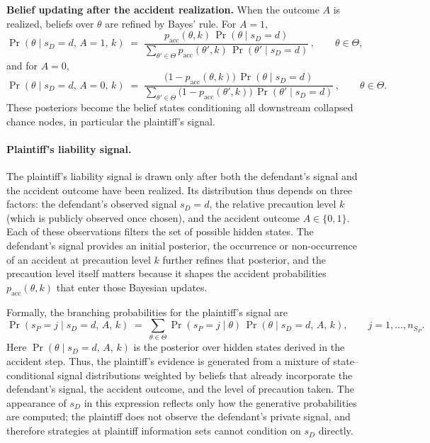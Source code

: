 \documentclass{article}
\begin{document}
\medskip
\noindent\textbf{Belief updating after the accident realization.}
When the outcome $A$ is realized, beliefs over $\theta$ are refined by Bayes’ rule. For $A=1$,
\[
\Pr(\theta \mid s_D=d,\,A=1,\,k)
\;=\;
\frac{p_{\mathrm{acc}}(\theta,k)\,\Pr(\theta \mid s_D=d)}
{\sum_{\theta'\in\Theta} p_{\mathrm{acc}}(\theta',k)\,\Pr(\theta' \mid s_D=d)}\,,
\qquad \theta\in\Theta,
\]
and for $A=0$,
\[
\Pr(\theta \mid s_D=d,\,A=0,\,k)
\;=\;
\frac{\bigl(1-p_{\mathrm{acc}}(\theta,k)\bigr)\,\Pr(\theta \mid s_D=d)}
{\sum_{\theta'\in\Theta} \bigl(1-p_{\mathrm{acc}}(\theta',k)\bigr)\,\Pr(\theta' \mid s_D=d)}\,,
\qquad \theta\in\Theta.
\]
These posteriors become the belief states conditioning all downstream collapsed chance nodes, in particular the plaintiff’s signal.

\paragraph{Plaintiff’s liability signal.}
The plaintiff’s liability signal is drawn only after both the defendant’s signal and the accident outcome have been realized. Its distribution thus depends on three factors: the defendant’s observed signal $s_D=d$, the relative precaution level $k$ (which is publicly observed once chosen), and the accident outcome $A\in\{0,1\}$. Each of these observations filters the set of possible hidden states. The defendant’s signal provides an initial posterior, the occurrence or non-occurrence of an accident at precaution level $k$ further refines that posterior, and the precaution level itself matters because it shapes the accident probabilities $p_{\mathrm{acc}}(\theta,k)$ that enter those Bayesian updates.

Formally, the branching probabilities for the plaintiff’s signal are
\[
\Pr(s_P=j \mid s_D=d,\,A,\,k)
\;=\;\sum_{\theta\in\Theta} \Pr(s_P=j \mid \theta)\,\Pr(\theta \mid s_D=d,\,A,\,k),
\qquad j=1,\dots,n_{S_P}.
\]
Here $\Pr(\theta \mid s_D=d,\,A,\,k)$ is the posterior over hidden states derived in the accident step. Thus, the plaintiff’s evidence is generated from a mixture of state–conditional signal distributions weighted by beliefs that already incorporate the defendant’s signal, the accident outcome, and the level of precaution taken. The appearance of $s_D$ in this expression reflects only how the generative probabilities are computed; the plaintiff does not observe the defendant’s private signal, and therefore strategies at plaintiff information sets cannot condition on $s_D$ directly.
\end{document}

